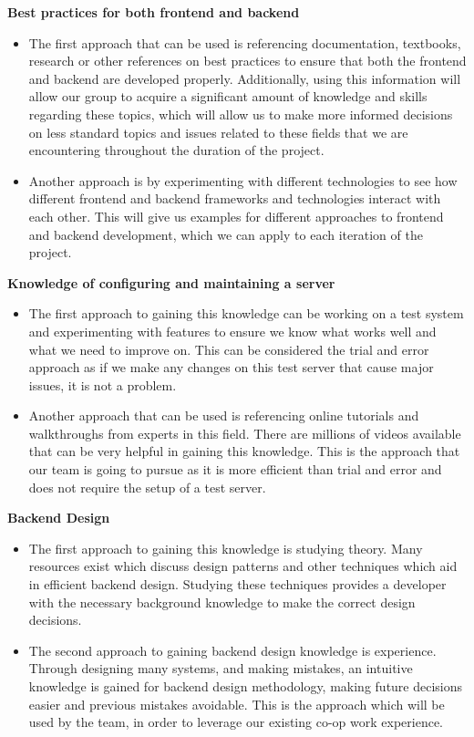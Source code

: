 \documentclass[12pt]{article}
\begin{document}
\begin{enumerate}
\begin{itemize}
\end{itemize}
\textbf{Best practices for both frontend and backend}
\begin{itemize}
    \item The first approach that can be used is referencing documentation, textbooks, research or other references on best practices to ensure that both the frontend and backend are developed properly. Additionally, using this information will allow our group to acquire a significant amount of knowledge and skills regarding these topics, which will allow us to make more informed decisions on less standard topics and issues related to these fields that we are encountering throughout the duration of the project.
    \item Another approach is by experimenting with different technologies to see how different frontend and backend frameworks and technologies interact with each other. This will give us examples for different approaches to frontend and backend development, which we can apply to each iteration of the project.
\end{itemize}
\textbf{Knowledge of configuring and maintaining a server}
\begin{itemize}
\item The first approach to gaining this knowledge can be working on a test system and experimenting with features to ensure we know what works well and what we need to improve on. This can be considered the trial and error approach as if we make any changes on this test server that cause major issues, it is not a problem.
\item Another approach that can be used is referencing online tutorials and walkthroughs from experts in this field. There are millions of videos available that can be very helpful in gaining this knowledge. This is the approach that our team is going to pursue as it is more efficient than trial and error and does not require the setup of a test server. 
\end{itemize}
\textbf{Backend Design}
\begin{itemize}
\item The first approach to gaining this knowledge is studying theory. Many resources exist which discuss design patterns and other techniques which aid in efficient backend design. Studying these techniques provides a developer with the necessary background knowledge to make the correct design decisions.
\item The second approach to gaining backend design knowledge is experience. Through designing many systems, and making mistakes, an intuitive knowledge is gained for backend design methodology, making future decisions easier and previous mistakes avoidable. This is the approach which will be used by the team, in order to leverage our existing co-op work experience.
\end{itemize}

\end{enumerate}
\end{document}
